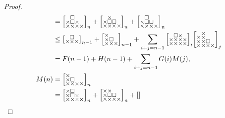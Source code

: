 \documentclass[a4paper,12pt]{article}
\makeatletter
\newenvironment{grid}
  {\begingroup\footnotesize
   \renewcommand{\arraystretch}{0}
   \setlength{\arraycolsep}{0pt}
   \left[\begin{array}{@{}*{10}{c}@{}}}
  {\end{array}\right]\endgroup}
\newcommand{\void}{\phantom{\times}}
\newcommand{\myF}{
    \begin{grid}
        \void & \square & \void \\
        \times & \times & \times
    \end{grid}
}
\newcommand{\myH}{
    \begin{grid}
        \times & \void & \void \\
        \times & \square & \void \\
        \times & \times & \times
    \end{grid}
}
\newcommand{\myM}{
    \begin{grid}
        \times & \void & \void & \void \\
        \times & \square & \void & \void \\
        \times & \times & \times & \times
    \end{grid}
}
\makeatother
\begin{document}
\begin{proof}
\begin{align*}
    &=\begin{grid}
        \void & \square & \void & \void \\
        \times & \square & \times & \void \\
        \times & \times & \times & \times
    \end{grid}_n
    +
    \begin{grid}
        \void & \times & \void & \void \\
        \times & \square & \square & \void \\
        \times & \times & \times & \times
    \end{grid}_n
    +
    \begin{grid}
        \void & \square & \void & \void \\
        \times & \square & \square & \void \\
        \times & \times & \times & \times
    \end{grid}_n \\
	&\le \myF_{n-1}
	+ \myH_{n-1} + \sum_{i+j=n-1}
    \begin{grid}
        \void & \square & \times & \void \\
        \times & \times & \times & \times \\
        \times & \times & \times & \times
    \end{grid}_i \begin{grid}
        \void & \times & \void & \void \\
        \times & \times & \void & \void \\
        \times & \times & \square & \void \\
        \times & \times & \times & \times
    \end{grid}_j \\
    &= F(n-1) + H(n-1) + \sum_{i+j=n-1} G(i) M(j),\\
    M(n) &= \myM_n \\
    &= \begin{grid}
        \times & \square & \void & \void \\
        \times & \square & \times & \void \\
        \times & \times & \times & \times
    \end{grid}_n + \begin{grid}
        \times & \times & \void & \void \\
        \times & \square & \square & \void \\
        \times & \times & \times & \times
    \end{grid}_n + \begin{grid}

\end{grid}
\end{align*}
\end{proof}
\end{document}

